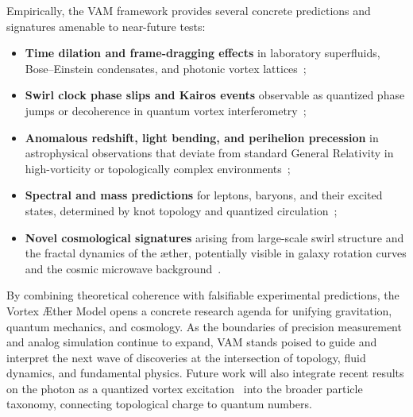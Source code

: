 Empirically, the VAM framework provides several concrete predictions and signatures amenable to near-future tests:
\begin{itemize}
    \item \textbf{Time dilation and frame-dragging effects} in laboratory superfluids, Bose–Einstein condensates, and photonic vortex lattices~\cite{VAM-2, VAM-13};
    \item \textbf{Swirl clock phase slips and Kairos events} observable as quantized phase jumps or decoherence in quantum vortex interferometry~\cite{VAM-15};
    \item \textbf{Anomalous redshift, light bending, and perihelion precession} in astrophysical observations that deviate from standard General Relativity in high-vorticity or topologically complex environments~\cite{VAM-10};
    \item \textbf{Spectral and mass predictions} for leptons, baryons, and their excited states, determined by knot topology and quantized circulation~\cite{VAM-11, VAM-14};
    \item \textbf{Novel cosmological signatures} arising from large-scale swirl structure and the fractal dynamics of the æther, potentially visible in galaxy rotation curves and the cosmic microwave background~\cite{VAM-9, VAM-12}.
\end{itemize}

By combining theoretical coherence with falsifiable experimental predictions, the Vortex Æther Model opens a concrete research agenda for unifying gravitation, quantum mechanics, and cosmology. As the boundaries of precision measurement and analog simulation continue to expand, VAM stands poised to guide and interpret the next wave of discoveries at the intersection of topology, fluid dynamics, and fundamental physics. Future work will also integrate recent results on the photon as a quantized vortex excitation~\cite{VAM-17.1} into the broader particle taxonomy, connecting topological charge to quantum numbers.
